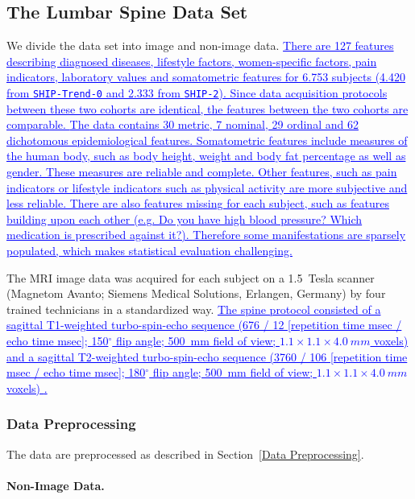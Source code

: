 \documentclass[journal]{style/vgtc} 			          %
\newcommand{\add}[1]{\textcolor{blue}{\uline{#1}}}
\begin{document}
\subsection{The Lumbar Spine Data Set}
We divide the data set into image and non-image data.
%
\add{
There are 127 features describing diagnosed diseases, lifestyle factors, women-specific factors, pain indicators, laboratory values and somatometric features for 6.753 subjects (4.420 from \texttt{SHIP-Trend-0} and 2.333 from \texttt{SHIP-2}).
%
Since data acquisition protocols between these two cohorts are identical, the features between the two cohorts are comparable.
}
%
\add{The data contains 30 metric, 7 nominal, 29 ordinal and 62 dichotomous epidemiological features.
%
Somatometric features include measures of the human body, such as body height, weight and body fat percentage as well as gender.
%
These measures are reliable and complete.
%
Other features, such as pain indicators or lifestyle indicators such as physical activity are more subjective and less reliable.
%
There are also features missing for each subject, such as features building upon each other (e.g. Do you have high blood pressure? Which medication is prescribed against it?).
%
Therefore some manifestations are sparsely populated, which makes statistical evaluation challenging.
%
}
%

The MRI image data was acquired for each subject on a 1.5~Tesla scanner (Magnetom Avanto; Siemens Medical Solutions, Erlangen, Germany) by four trained technicians in a standardized way.
%
\add{The spine protocol consisted of a sagittal T1-weighted turbo-spin-echo sequence (676 / 12 [repetition time msec / echo time msec]; 150$^\circ$ flip angle; 500~mm field of view; $1.1\times1.1\times4.0~mm$ voxels) and a sagittal T2-weighted turbo-spin-echo sequence (3760 / 106 [repetition time msec / echo time msec]; 180$^\circ$ flip angle; 500~mm field of view; $1.1\times1.1\times4.0~mm$ voxels) \cite{Hegenscheid2013}.
}

\subsubsection{Data Preprocessing} \label{application:Data Preprocessing}
The data are preprocessed as described in Section~\ref{Data Preprocessing}.
%
\paragraph{Non-Image Data.} 
\end{document}
